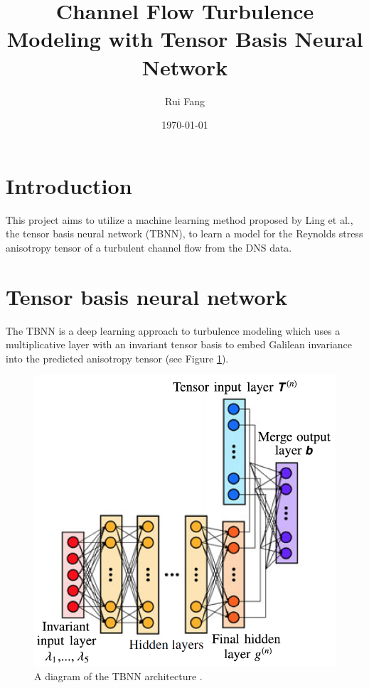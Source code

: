 \documentclass{article}
\title{Channel Flow Turbulence Modeling with Tensor Basis Neural Network}
\author{Rui Fang}
\date{\today}
\numberwithin{equation}{section}
\begin{document}
\maketitle

\section{Introduction}
This project aims to utilize a machine learning method proposed by Ling et al., the tensor basis neural network (TBNN), to learn a model for the Reynolds stress anisotropy tensor of a turbulent channel flow from the DNS data. 



\section{Tensor basis neural network}

The TBNN is a deep learning approach to turbulence modeling which uses a multiplicative layer with an invariant tensor basis to embed Galilean invariance into the predicted anisotropy tensor (see Figure \ref{fig:tbnn}).
\begin{figure}[h]
    \centering
    \includegraphics[width=0.4\linewidth]{TBNN.png}
    \caption{A diagram of the TBNN architecture \cite{ling2016reynolds}.}
    \label{fig:tbnn} 
\end{figure}
\end{document}
